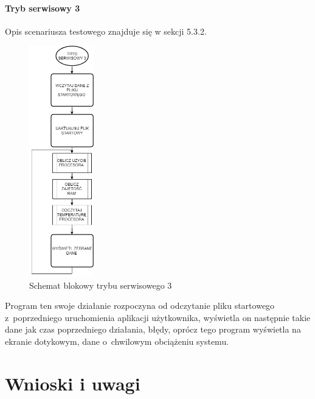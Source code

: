 \documentclass[12pt, eng, twoside, openany, final]{mgr}
\begin{document}
                    \subsubsection{Tryb serwisowy 3}
                    Opis scenariusza testowego znajduje się w sekcji 5.3.2.
                        \begin{figure}[H]
                        \begin{center}
                            \includegraphics[width=0.25\textwidth]{t3.png}
                            \caption{Schemat blokowy trybu serwisowego 3} \label{fig:serT3}
                        \end{center}
                        \end{figure}
                        \noindent Program ten swoje działanie rozpoczyna od odczytanie pliku startowego z~poprzedniego uruchomienia aplikacji użytkownika, wyświetla on następnie takie dane jak czas poprzedniego działania, błędy, oprócz tego program wyświetla na ekranie dotykowym, dane o~chwilowym obciążeniu systemu.
                    
                        \newpage

\chapter{Wnioski i uwagi}
\thispagestyle{fancy}



\listoffigures
\listoftables


\end{document}
